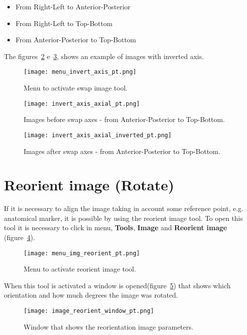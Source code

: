 \begin{itemize}
	\item From Right-Left to Anterior-Posterior
	\item From Right-Left to Top-Bottom
	\item From Anterior-Posterior to Top-Bottom
\end{itemize}


The figures~\ref{fig:invert_axis_axial} e~\ref{fig:invert_axis_axial_inverted}, shows an example of images with inverted axis.

\begin{figure}[!htb]
\centering
\texttt{[image: menu\_invert\_axis\_pt.png]}
\caption{Menu to activate swap image tool.}
\label{fig:menu_invert_axis}
\end{figure}

\begin{figure}[!htb]
\centering
\texttt{[image: invert\_axis\_axial\_pt.png]}
\caption{Images before swap axes - from Anterior-Posterior to Top-Bottom.}
\label{fig:invert_axis_axial}
\end{figure}

\begin{figure}[!htb]
\centering
\texttt{[image: invert\_axis\_axial\_inverted\_pt.png]}
\caption{Images after swap axes - from Anterior-Posterior to Top-Bottom.}
\label{fig:invert_axis_axial_inverted}
\end{figure}

\section{Reorient image (Rotate)}

If it is necessary to align the image taking in account some reference point, e.g. anatomical marker, it is possible by using the reorient image tool. To open this tool it is necessary to click in menu, \textbf{Tools}, \textbf{Image} and \textbf{Reorient image} (figure~\ref{fig:menu_img_reorient}).

\begin{figure}[!htb]
\centering
\texttt{[image: menu\_img\_reorient\_pt.png]}
\caption{Menu to activate reorient image tool.}
\label{fig:menu_img_reorient}
\end{figure}

When this tool is activated a window is opened(figure~\ref{fig:image_reorient_window}) that shows which orientation and how much degrees the image was rotated.
\begin{figure}[!htb]
\centering
\texttt{[image: image\_reorient\_window\_pt.png]}
\caption{Window that shows the reorientation image parameters.}
\label{fig:image_reorient_window}
\end{figure}

